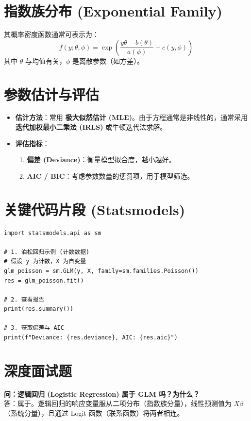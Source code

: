\documentclass[12pt, a4paper]{article}
\begin{document}
\section{指数族分布 (Exponential Family)}
其概率密度函数通常可表示为：
$$ f(y; \theta, \phi) = \exp\left( \frac{y\theta - b(\theta)}{a(\phi)} + c(y, \phi) \right) $$
其中 $\theta$ 与均值有关，$\phi$ 是离散参数（如方差）。

\section{参数估计与评估}
\begin{itemize}
    \item \textbf{估计方法}：常用 \textbf{极大似然估计 (MLE)}。由于方程通常是非线性的，通常采用 \textbf{迭代加权最小二乘法 (IRLS)} 或牛顿迭代法求解。
    \item \textbf{评估指标}：
        \begin{enumerate}
            \item \textbf{偏差 (Deviance)}：衡量模型拟合度，越小越好。
            \item \textbf{AIC / BIC}：考虑参数数量的惩罚项，用于模型筛选。
        \end{enumerate}
\end{itemize}

\section{关键代码片段 (Statsmodels)}
\begin{lstlisting}
import statsmodels.api as sm

# 1. 泊松回归示例 (计数数据)
# 假设 y 为计数，X 为自变量
glm_poisson = sm.GLM(y, X, family=sm.families.Poisson())
res = glm_poisson.fit()

# 2. 查看报告
print(res.summary())

# 3. 获取偏差与 AIC
print(f"Deviance: {res.deviance}, AIC: {res.aic}")
\end{lstlisting}

\section{深度面试题}

\textbf{问：逻辑回归 (Logistic Regression) 属于 GLM 吗？为什么？}\\
答：属于。逻辑回归的响应变量服从二项分布（指数族分量），线性预测值为 $X\beta$（系统分量），且通过 Logit 函数（联系函数）将两者相连。
\end{document}
